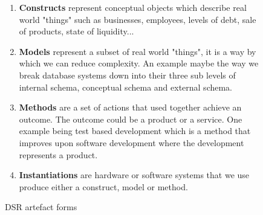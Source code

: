 \begin{figure}[ht]
    \caption{DSR artefact forms} \label{fig:artefactforms}
    \begin{enumerate}[label=Form \arabic*:, leftmargin=*]
        \item \textbf{Constructs} represent conceptual objects which describe real world "things" such as businesses, employees, levels of debt, sale of products, state of liquidity...

        \item \textbf{Models} represent a subset of real world "things", it is a way by which we can reduce complexity. An example maybe the way we break database systems down into their three sub levels of internal schema, conceptual schema and external schema.

        \item \textbf{Methods} are a set of actions that used together achieve an outcome. The outcome could be a product or a service. One example being test based development which is a method that improves upon software development where the development represents a product.

        \item \textbf{Instantiations} are hardware or software systems that we use produce either a construct, model or method.
    \end{enumerate}
\end{figure}